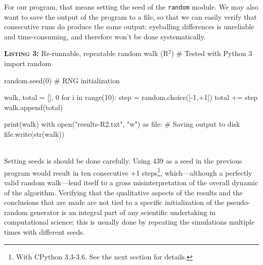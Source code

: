 \documentclass[a4paper,11pt]{article}
\begin{document}
For our program, that means setting the seed of the {\tt random} module. We may also want to save the output of the program to a file, so that we can easily verify that consecutive runs do produce the same output: eyeballing differences is unreliable and  time-consuming, and therefore won't be done systematically.\\

\noindent \begin{minipage}[c]{\linewidth}
\begin{code}{\textbf{\textsc{Listing 3:}} Re-runnable, repeatable random walk (R$^2$)}
# Tested with Python 3
import random

random.seed(0) # RNG initialization

walk, total = [], 0
for i in range(10):
    step = random.choice([-1,+1])
    total += step
    walk.append(total)

print(walk)
with open("results-R2.txt", "w") as file: # Saving output to disk
    file.write(str(walk))
\end{code}
\end{minipage}\\

Setting seeds is should be done carefully. Using 439 as a seed in the previous program would result in ten consecutive +1 steps\footnote{With CPython 3.3-3.6. See the next section for details.}, which---although a perfectly valid random walk---lend itself to a gross misinterpretation of the overall dynamic of the algorithm. Verifying that the qualitative aspects of the results and the conclusions that are made are not tied to a specific initialization of the pseudo-random generator is an integral part of any scientific undertaking in computational science;
this is usually done by repeating the simulations multiple times with different seeds.

\end{document}
